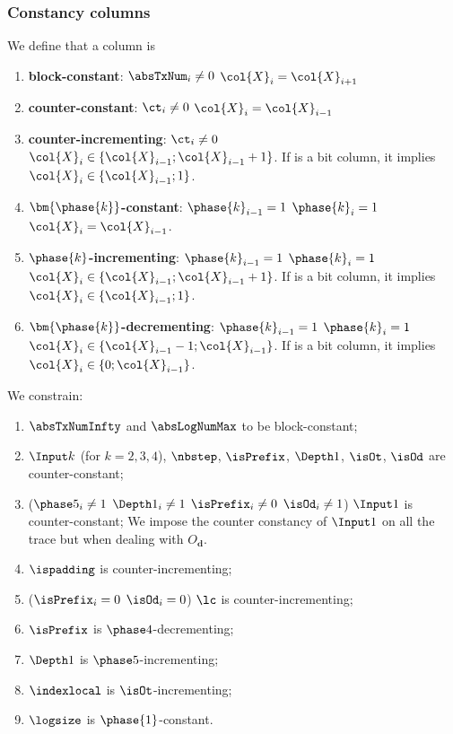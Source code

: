 \subsubsection{Constancy columns} \label{constancy_constraints}
We define that a column  is
\begin{enumerate}
    \item \textbf{block-constant}: \If $\absTxNum_{i} \neq 0$ \Then $\col{X}_{i}=\col{X}_{i+1}$
    \item \textbf{counter-constant}: \If $\ct_{i} \neq 0$ \Then $\col{X}_{i}=\col{X}_{i-1}$
    \item \textbf{counter-incrementing}: \If $\ct_{i} \neq 0$ \Then $\col{X}_{i} \in \{\col{X}_{i-1}; \col{X}_{i-1} +1 \}$. If  is a bit column, it implies $\col{X}_{i} \in \{\col{X}_{i-1}; 1 \}$.
    \item \textbf{$\bm{\phase{k}}$-constant}: \If $\phase{k}_{i-1} = 1$ \et $\phase{k}_{i}=1$ \Then $\col{X}_{i}=\col{X}_{i-1}$.
    \item \textbf{$\phase{k}$-incrementing}: \If $\phase{k}_{i-1} = 1$ \et $\phase{k}_{i}=1$ \Then $\col{X}_{i} \in \{\col{X}_{i-1}; \col{X}_{i-1} +1 \}$. If  is a bit column, it implies $\col{X}_{i} \in \{\col{X}_{i-1}; 1 \}$.
    \item \textbf{$\bm{\phase{k}}$-decrementing}: \If $\phase{k}_{i-1} = 1$ \et $\phase{k}_{i}=1$ \Then $\col{X}_{i} \in \{\col{X}_{i-1} -1; \col{X}_{i-1} \}$. If  is a bit column, it implies $\col{X}_{i} \in \{0 ; \col{X}_{i-1}\}$.
\end{enumerate}

We constrain: 
\begin{enumerate}
    \item $\absTxNumInfty$ and $\absLogNumMax$ to be block-constant;
    \item $\Input k$ (for $k= 2, 3, 4$), $\nbstep$, $\isPrefix$, $\Depth 1$, $\isOt$, $\isOd$  are counter-constant;
    \item \If ($\phase 5_{i} \neq 1$ \Or $\Depth1_{i} \neq 1$ \Or $\isPrefix_{i} \neq 0$ \Or $\isOd_{i} \neq 1$) \Then $\Input 1$ is counter-constant;
    \saNote{} We impose the counter constancy of $\Input 1$ on all the trace but when dealing with $O_{\textbf{d}}$.

    \item $\ispadding$ is counter-incrementing;
    \item \If ($\isPrefix_{i}=0$ \Or $\isOd_{i}=0$) \Then $\lc$ is counter-incrementing;
    \item $\isPrefix$ is $\phase 4$-decrementing;
    \item $\Depth 1$ is $\phase 5$-incrementing;
    \item $\indexlocal$ is $\isOt$-incrementing;
    \item $\logsize$ is $\phase{1}$-constant.
\end{enumerate}

